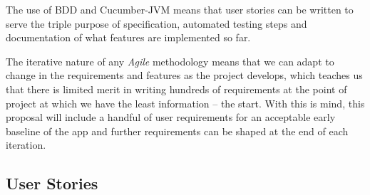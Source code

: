 \documentclass{article}
\begin{document}
The use of BDD and Cucumber-JVM means that user stories can be written to
serve the triple purpose of specification, automated testing steps and
documentation of what features are implemented so far.

The iterative
nature of any \emph{Agile} methodology means that we can adapt to change
in the requirements and features as the project develops, which teaches
us that there is limited merit in writing hundreds of requirements at the
point of project at which we have the least information -- the start. With
this is mind, this proposal will include a handful of user requirements for
an acceptable early baseline of the app and further requirements can be
shaped at the end of each iteration.

\subsection{User Stories}
\end{document}

